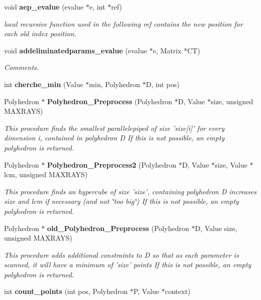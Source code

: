 \begin{CompactItemize}
void {\bf aep\_\-evalue} (evalue $\ast$e, int $\ast$ref)
\begin{CompactList}\small\item\em local recursive function used in the following ref contains the new position for each old index position.\item\end{CompactList}\item 
void {\bf addeliminatedparams\_\-evalue} (evalue $\ast$e, Matrix $\ast$CT)
\begin{CompactList}\small\item\em Comments.\item\end{CompactList}\item 
int {\bf cherche\_\-min} (Value $\ast$min, Polyhedron $\ast$D, int pos)
\item 
Polyhedron $\ast$ {\bf Polyhedron\_\-Preprocess} (Polyhedron $\ast$D, Value $\ast$size, unsigned MAXRAYS)
\begin{CompactList}\small\item\em This procedure finds the smallest parallelepiped of size '{\em size[i]}' for every dimension i, contained in polyhedron D If this is not possible, an empty polyhedron is returned.\item\end{CompactList}\item 
Polyhedron $\ast$ {\bf Polyhedron\_\-Preprocess2} (Polyhedron $\ast$D, Value $\ast$size, Value $\ast$lcm, unsigned MAXRAYS)
\begin{CompactList}\small\item\em This procedure finds an hypercube of size 'size', containing polyhedron D increases size and lcm if necessary (and not \char`\"{}too big\char`\"{}) If this is not possible, an empty polyhedron is returned.\item\end{CompactList}\item 
Polyhedron $\ast$ {\bf old\_\-Polyhedron\_\-Preprocess} (Polyhedron $\ast$D, Value size, unsigned MAXRAYS)
\begin{CompactList}\small\item\em This procedure adds additional constraints to D so that as each parameter is scanned, it will have a minimum of 'size' points If this is not possible, an empty polyhedron is returned.\item\end{CompactList}\item 
int {\bf count\_\-points} (int pos, Polyhedron $\ast$P, Value $\ast$context)

\end{CompactItemize}
